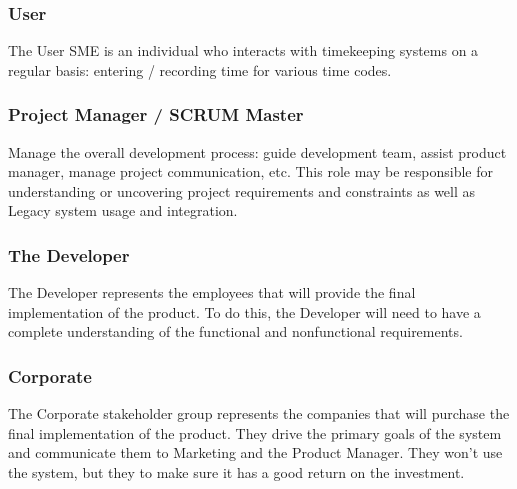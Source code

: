 \documentclass[12pt]{article}
\begin{document}
\subsubsection{User}
The User SME is an individual who interacts with timekeeping systems on a regular basis: entering / recording time for various time codes. 

\subsubsection{Project Manager / SCRUM Master}
Manage the overall development process: guide development team, assist product manager, manage project communication, etc.  This role may be responsible for understanding or uncovering project requirements and constraints as well as Legacy system usage and integration.

\subsubsection{The Developer}
The Developer represents the employees that will provide the final implementation of the product. To do this, the Developer will need to have a complete understanding of the functional and nonfunctional requirements.

\subsubsection{Corporate}
The Corporate stakeholder group represents the companies that will purchase the final implementation of the product. They drive the primary goals of the system and communicate them to Marketing and the Product Manager. They won’t use the system, but they to make sure it has a good return on the investment.
\end{document}
